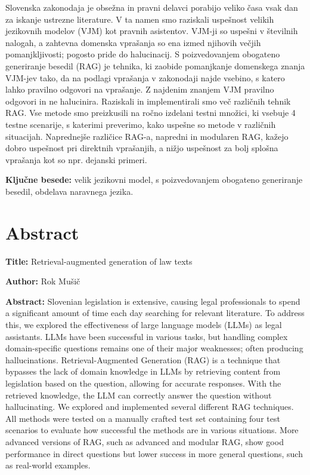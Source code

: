 \documentclass[a4paper,12pt,openright]{book}
\newcommand{\ttitleEn}{Retrieval-augmented generation of law texts}
\newcommand{\tauthor}{Rok Mušič}
\newcommand{\tkeywords}{velik jezikovni model, s poizvedovanjem obogateno generiranje besedil, obdelava naravnega jezika}
\newcommand{\clearemptydoublepage}{\newpage{\pagestyle{empty}\cleardoublepage}}
\begin{document}
\noindent Slovenska zakonodaja je obsežna in pravni delavci porabijo veliko časa vsak dan za iskanje ustrezne literature. V ta namen smo raziskali uspešnost velikih jezikovnih modelov (VJM) kot pravnih asistentov. VJM-ji so uspešni v številnih nalogah, a zahtevna domenska vprašanja so ena izmed njihovih večjih pomanjkljivosti; pogosto pride do halucinacij. S poizvedovanjem obogateno generiranje besedil (RAG) je tehnika, ki zaobide pomanjkanje domenskega znanja VJM-jev tako, da na podlagi vprašanja v zakonodaji najde vsebino, s katero lahko pravilno odgovori na vprašanje. Z najdenim znanjem VJM pravilno odgovori in ne halucinira. Raziskali in implementirali smo več različnih tehnik RAG. Vse metode smo preizkusili na ročno izdelani testni množici, ki vsebuje 4 testne scenarije, s katerimi preverimo, kako uspešne so metode v različnih situacijah. Naprednejše različice RAG-a, napredni in modularen RAG, kažejo dobro uspešnost pri direktnih vprašanjih, a nižjo uspešnost za bolj splošna vprašanja kot so npr. dejanski primeri.

\bigskip

\noindent\textbf{Ključne besede:} \tkeywords.
\clearemptydoublepage

{}
\chapter*{Abstract}

\noindent\textbf{Title:} \ttitleEn
\bigskip

\noindent\textbf{Author:} \tauthor
\bigskip

\noindent\textbf{Abstract:} 
\noindent Slovenian legislation is extensive, causing legal professionals to spend a significant amount of time each day searching for relevant literature. To address this, we explored the effectiveness of large language models (LLMs) as legal assistants. LLMs have been successful in various tasks, but handling complex domain-specific questions remains one of their major weaknesses; often producing hallucinations. Retrieval-Augmented Generation (RAG) is a technique that bypasses the lack of domain knowledge in LLMs by retrieving content from legislation based on the question, allowing for accurate responses. With the retrieved knowledge, the LLM can correctly answer the question without hallucinating. We explored and implemented several different RAG techniques. All methods were tested on a manually crafted test set containing four test scenarios to evaluate how successful the methods are in various situations. More advanced versions of RAG, such as advanced and modular RAG, show good performance in direct questions but lower success in more general questions, such as real-world examples.
\bigskip
\end{document}
